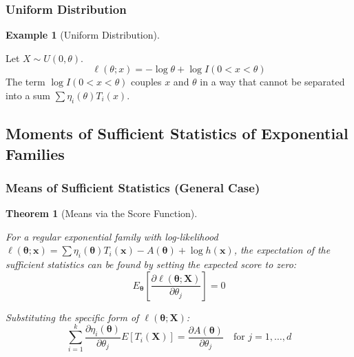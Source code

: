 \documentclass[
  letterpaper,
  DIV=11,
  numbers=noendperiod]{scrreprt}
\renewcommand{\[}{\begin{equation}}
\renewcommand{\]}{\end{equation}}
\theoremstyle{definition}
\theoremstyle{plain}
\theoremstyle{plain}
\theoremstyle{plain}
\newtheorem{theorem}{Theorem}[chapter]
\theoremstyle{definition}
\newtheorem{example}{Example}[chapter]
\theoremstyle{plain}
\theoremstyle{remark}
\begin{document}
\subsubsection*{Uniform Distribution}\label{uniform-distribution}

\begin{example}[Uniform
Distribution]\protect\hypertarget{exm-uniform-dist}{}\label{exm-uniform-dist}

Let \(X \sim U(0, \theta)\). \[
\ell(\theta; x) = -\log \theta + \log I(0 < x < \theta)
\] The term \(\log I(0 < x < \theta)\) couples \(x\) and \(\theta\) in a
way that cannot be separated into a sum \(\sum \eta_i(\theta) T_i(x).\)

\end{example}

\subsection{Moments of Sufficient Statistics of Exponential
Families}\label{moments-of-sufficient-statistics-of-exponential-families}

\subsubsection{Means of Sufficient Statistics (General
Case)}\label{means-of-sufficient-statistics-general-case}

\begin{theorem}[Means via the Score
Function]\protect\hypertarget{thm-moments-exp-family}{}\label{thm-moments-exp-family}

For a regular exponential family with log-likelihood
\(\ell(\boldsymbol{\theta}; \mathbf{x}) = \sum \eta_i(\boldsymbol{\theta}) T_i(\mathbf{x}) - A(\boldsymbol{\theta}) + \log h(\mathbf{x})\),
the expectation of the sufficient statistics can be found by setting the
expected score to zero: \[
E_{\boldsymbol{\theta}} \left[ \frac{\partial \ell(\boldsymbol{\theta}; \mathbf{X})}{\partial \theta_j} \right] = 0
\]

Substituting the specific form of
\(\ell(\boldsymbol{\theta}; \mathbf{X})\): \[
\sum_{i=1}^k \frac{\partial \eta_i(\boldsymbol{\theta})}{\partial \theta_j} E[T_i(\mathbf{X})] = \frac{\partial A(\boldsymbol{\theta})}{\partial \theta_j} \quad \text{for } j=1, \dots, d
\]

\end{theorem}
\end{document}
